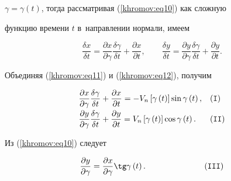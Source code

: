 $\gamma = \gamma \left( t \right)$, тогда рассматривая (\ref{khromov:eq10}) как сложную 

функцию времени $t$ в~направлении нормали, имеем

\begin{equation}

\label{khromov:eq12}

\frac{\delta x}{\delta t} = \frac{\partial x}{\partial \gamma }\frac{\delta 

\gamma }{\delta t} + \frac{\partial x}{\partial t},\qquad \frac{\delta 

y}{\delta t} = \frac{\partial y}{\partial \gamma }\frac{\delta \gamma 

}{\delta t} + \frac{\partial y}{\partial t}.

\end{equation}

Объединяя (\ref{khromov:eq11}) и (\ref{khromov:eq12}), получим

\[

\begin{array}{ll}

\displaystyle

 \frac{\partial x}{\partial \gamma }\frac{\delta \gamma }{\delta t} + 

\frac{\partial x}{\partial t} = - V_n \left[ {\gamma \left( t \right)} 

\right]\sin \gamma \left( t \right), &\tt \left( I \right) \vspace{1mm}\\ 

\displaystyle

 \frac{\partial y}{\partial \gamma }\frac{\delta \gamma }{\delta t} + 

\frac{\partial y}{\partial t} = V_n \left[ {\gamma \left( t \right)} 

\right]\cos \gamma \left( t \right).& \tt \left( {II} \right) 

 \end{array}

\]

Из (\ref{khromov:eq10}) следует

\begin{equation}

\label{khromov:eq13}

\frac{\partial y}{\partial \gamma } = \frac{\partial x}{\partial \gamma 

}\tg\gamma \left( t \right).\qquad\qquad\qquad\quad  \tt \left( {III} \right)

\end{equation}

